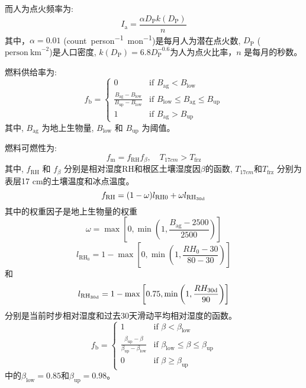 而人为点火频率为:
\begin{equation}
I_{\mathrm{a}}=\frac{\alpha D_{\mathrm{P}} k\left(D_{\mathrm{P}}\right)}{n}
\end{equation}
其中，$\alpha=0.01$ (\unit{count.person^{-1}.mon^{-1}})是每月人为潜在点火数, $D_{\mathrm {P}} $ ($\text{person}~\text{km}^{-2}$)是人口密度, $k\left(D_{\mathrm{P}}\right)=6.8D_{\mathrm {P}} ^{-0.6}$为人为点火比率，$n$ 是每月的秒数。

燃料供给率为:
\begin{equation}
  f_{\mathrm {b}}  = \begin{cases}
    0 & \text{if } B_{\mathrm{ag}} < B_{\text{low}}\\
    \frac{B_{\mathrm{ag}}-B_{\mathrm{low}}}{B_{\mathrm{up}}-B_{\mathrm{low}}} & \text{if } B_{\mathrm{low}} \leqslant B_{\mathrm{ag}} \leqslant B_{\mathrm{up}}\\
    1 & \text{if } B_{\mathrm{ag}} > B_{\mathrm{up}}
  \end{cases}
\end{equation}
其中, $B_{\mathrm{ag}}$ 为地上生物量, $B_{\mathrm{low}}$ 和 $B_{\mathrm{up}}$ 为阈值。

燃料可燃性为:
\begin{equation}
  f_{\mathrm {m}}  = f_{\mathrm{RH}} f_{\beta},\quad T_{17cm}>T_{\mathrm {frz}}
\end{equation}
其中, $f_{\mathrm{RH}}$ 和 $f_{\beta}$ 分别是相对湿度${\mathrm {RH}}$和根区土壤湿度因$\beta$的函数, $T_{17cm}$和$T_{\mathrm{frz}}$ 分别为表层17 cm的土壤温度和冰点温度。
%
\begin{equation}
  f_{\mathrm{RH}} = (1-\omega)l_{\mathrm{RH0}}+\omega l_{\mathrm{RH_{\rm 30d}}}
\end{equation}
其中的权重因子是地上生物量的权重 $$\omega=\max\left[0, \min\left(1, \frac{B_{\mathrm{ag}} - 2500}{2500}\right)\right]$$
$$l_{\mathrm{RH_0}}=1-\max\left[0, \min\left(1, \frac{RH_{\mathrm{0}} - 30}{80-30}\right)\right]$$
和
$$l_{\mathrm{RH_{\rm 30d}}}=1-\max\left[0.75, \min\left(1, \frac{RH_{\rm 30d}}{90}\right)\right]$$
分别是当前时步相对湿度和过去30天滑动平均相对湿度的函数。
\begin{equation}
  f_{\mathrm {b}}  = \begin{cases}
    1 & \text{if } \beta < \beta_{\mathrm{low}}\\
    \frac{\beta_{\mathrm{up}}-\beta}{\beta_{\mathrm{up}}-\beta_{\mathrm{low}}} & \text{if } \beta_{\mathrm{low}} \leqslant \beta \leqslant \beta_{\mathrm{up}}\\
    0 & \text{if } \beta \geqslant \beta_{\mathrm{up}}
  \end{cases}
\end{equation}
中的$\beta_{\mathrm{low}}=0.85$和$\beta_{\mathrm{up}}=0.98$。


